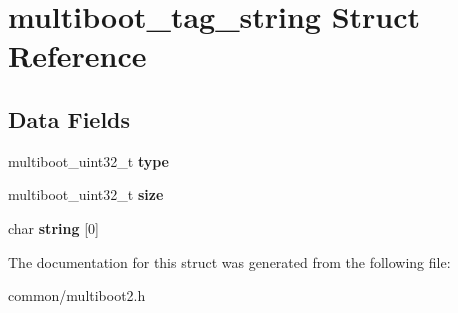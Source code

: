 \hypertarget{structmultiboot__tag__string}{}\section{multiboot\+\_\+tag\+\_\+string Struct Reference}
\label{structmultiboot__tag__string}
\subsection*{Data Fields}
\begin{DoxyCompactItemize}
\item 
multiboot\+\_\+uint32\+\_\+t {\bfseries type}\hypertarget{structmultiboot__tag__string_a5245d2ffd9a8f2242d41e9d4cc74a4d2}{}\label{structmultiboot__tag__string_a5245d2ffd9a8f2242d41e9d4cc74a4d2}

\item 
multiboot\+\_\+uint32\+\_\+t {\bfseries size}\hypertarget{structmultiboot__tag__string_a6f9d2fe9f40f166aca2369649380f0f5}{}\label{structmultiboot__tag__string_a6f9d2fe9f40f166aca2369649380f0f5}

\item 
char {\bfseries string} \mbox{[}0\mbox{]}\hypertarget{structmultiboot__tag__string_a50125b332242abd0051cd348fd2d9b68}{}\label{structmultiboot__tag__string_a50125b332242abd0051cd348fd2d9b68}

\end{DoxyCompactItemize}


The documentation for this struct was generated from the following file\+:\begin{DoxyCompactItemize}
\item 
common/multiboot2.\+h\end{DoxyCompactItemize}
